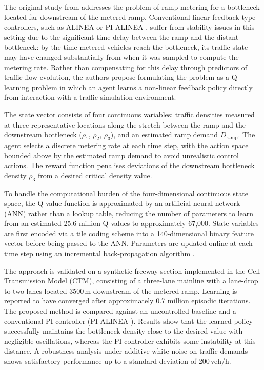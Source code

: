 The original study from \cite{ORIGINAL_STUDY} addresses the problem of ramp
metering for a bottleneck located far downstream of the metered ramp. Conventional
linear feedback-type controllers, such as ALINEA \citep{ALINEA} or PI-ALINEA \citep{PI-ALINEA},
suffer from stability issues in this setting due to the significant time-delay between
the ramp and the distant bottleneck: by the time metered vehicles reach the bottleneck,
its traffic state may have changed substantially from when it was sampled to compute
the metering rate. Rather than compensating for this delay through predictors of traffic
flow evolution, the authors propose formulating the problem as a Q-learning problem in
which an agent learns a non-linear feedback policy directly from interaction with a
traffic simulation environment.

The state vector consists of four continuous variables: traffic densities measured at
three representative locations along the stretch between the ramp and the downstream
bottleneck ($\rho_1$, $\rho_2$, $\rho_3$), and an estimated ramp demand $D_\text{ramp}$.
The agent selects a discrete metering rate at each time step, with the action space
bounded above by the estimated ramp demand to avoid unrealistic control actions. The
reward function penalises deviations of the downstream bottleneck density $\rho_3$ from
a desired critical density value.

To handle the computational burden of the four-dimensional continuous state space, the
Q-value function is approximated by an artificial neural network (ANN) rather than a
lookup table, reducing the number of parameters to learn from an estimated 25.6 million
Q-values to approximately 67,000. State variables are first encoded via a tile coding
scheme into a 140-dimensional binary feature vector before being passed to the ANN.
Parameters are updated online at each time step using an incremental back-propagation
algorithm \citep{Backpropagation}.

The approach is validated on a synthetic freeway section implemented in the Cell
Transmission Model (CTM), consisting of a three-lane mainline with a lane-drop to two
lanes located 3500\,m downstream of the metered ramp.
Learning is reported to have converged after
approximately 0.7 million episodic iterations. The proposed method is compared against
an uncontrolled baseline and a conventional PI controller (PI-ALINEA \citep{PI-ALINEA}). Results show that the learned
policy successfully maintains the bottleneck density close to the desired value with
negligible oscillations, whereas the PI controller exhibits some instability at this
distance. A robustness analysis under additive white noise on traffic demands shows
satisfactory performance up to a standard deviation of 200\,veh/h.


